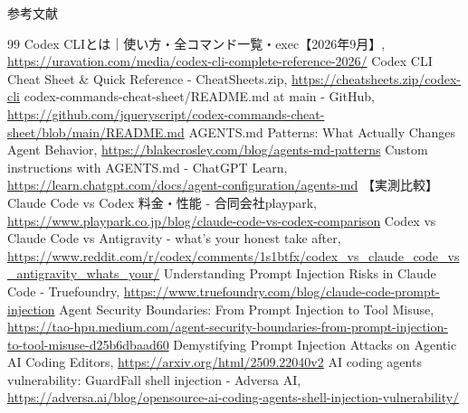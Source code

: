 \documentclass[aspectratio=169,11pt]{beamer}
\begin{document}
\begin{frame}[allowframebreaks]{参考文献}
\begin{thebibliography}{99}
     Codex CLIとは｜使い方・全コマンド一覧・exec【2026年9月】, \url{https://uravation.com/media/codex-cli-complete-reference-2026/}
     Codex CLI Cheat Sheet \& Quick Reference - CheatSheets.zip, \url{https://cheatsheets.zip/codex-cli}
     codex-commands-cheat-sheet/README.md at main - GitHub, \url{https://github.com/jqueryscript/codex-commands-cheat-sheet/blob/main/README.md}
     AGENTS.md Patterns: What Actually Changes Agent Behavior, \url{https://blakecrosley.com/blog/agents-md-patterns}
     Custom instructions with AGENTS.md - ChatGPT Learn, \url{https://learn.chatgpt.com/docs/agent-configuration/agents-md}
     【実測比較】Claude Code vs Codex 料金・性能 - 合同会社playpark, \url{https://www.playpark.co.jp/blog/claude-code-vs-codex-comparison}
     Codex vs Claude Code vs Antigravity - what's your honest take after, \url{https://www.reddit.com/r/codex/comments/1s1btfx/codex_vs_claude_code_vs_antigravity_whats_your/}
     Understanding Prompt Injection Risks in Claude Code - Truefoundry, \url{https://www.truefoundry.com/blog/claude-code-prompt-injection}
     Agent Security Boundaries: From Prompt Injection to Tool Misuse, \url{https://tao-hpu.medium.com/agent-security-boundaries-from-prompt-injection-to-tool-misuse-d25b6dbaad60}
     Demystifying Prompt Injection Attacks on Agentic AI Coding Editors, \url{https://arxiv.org/html/2509.22040v2}
     AI coding agents vulnerability: GuardFall shell injection - Adversa AI, \url{https://adversa.ai/blog/opensource-ai-coding-agents-shell-injection-vulnerability/}
  \end{thebibliography}
\end{frame}
\end{document}
